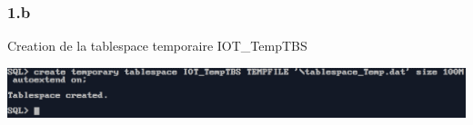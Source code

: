 \subsubsection*{1.b}
Creation de la tablespace temporaire IOT\_TempTBS



\begin{center}
    \includegraphics[width=\textwidth]{ScreenShot/Partie1/ts2.png}
\end{center}

